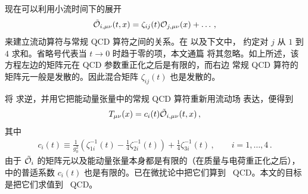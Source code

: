 现在可以利用小流时间下的展开\,\cite{Luscher:2011bx}
\begin{equation}
  \begin{split}
    \tilde{\mathcal{O}}_{i,\mu\nu}(t,x) = \zeta_{ij}(t)\mathcal{O}_{j,\mu\nu}(x) + \ldots\,,
    \label{eq:zetas}
  \end{split}
\end{equation}
来建立流动算符与常规 QCD 算符之间的关系。在  以及下文中，
约定对 $j$ 从 $1$ 到 $4$ 求和。省略号代表当 $t\to 0$ 时趋于零的项，本文通篇
将其忽略。如上所述，该方程左边的矩阵元在 QCD 参数重正化之后是有限的，而右边
常规 QCD 算符的矩阵元一般是发散的。因此混合矩阵 $\zeta_{ij}(t)$ 也是发散的。

将  求逆，并用它把能动量张量中的常规 QCD 算符重新用流动场
表达，便得到
\begin{equation}
  \begin{split}
    T_{\mu\nu}(x) =  c_i (t) \tilde{\mathcal{O}}_{i, \mu \nu} (t, x) \,,
    \label{eq:emtflow}
  \end{split}
\end{equation}
其中
\begin{equation}
  \begin{split}
    c_i(t) \equiv \frac{1}{g_{0}^2} \left( \zeta_{1i}^{-1} (t)
		 - \frac{1}{4} \zeta_{2i}^{-1} (t) \right)
		 + \frac{1}{4} \zeta_{3i}^{-1} (t)
                         \,,\qquad i=1,\ldots,4\,.
    \label{eq:EMTGF}
	\end{split}
\end{equation}
由于 $\tilde{\mathcal{O}}_i$ 的矩阵元以及能动量张量本身都是有限的（在质量与电荷重正化之后）， 中的普适系数 $c_i(t)$ 也是有限的。已在微扰论中把它们算到 \nlo\ QCD。本文的目标是把它们求值到 \nnlo\ QCD。

